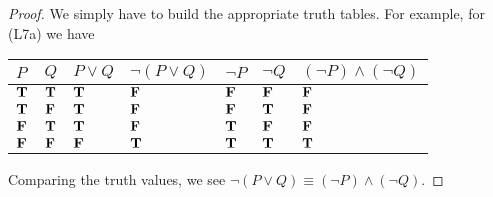 \vspace*{0.5em}
\begin{proof}
We simply have to build the appropriate truth tables. For example, for (L7a) we have\\
\begin{center}
{\renewcommand{\arraystretch}{1.5}%
\begin{tabular}{|>{\centering}m{1cm}|>{\centering}m{1cm}|>{\centering}m{1.5cm}||>{\centering}m{1.75cm}||>{\centering}m{1cm}|>{\centering}m{1cm}||>{\centering\arraybackslash}m{2.5cm}|}
\hline
\rowcolor{lightgrey}
$P$ & $Q$ & $P \vee Q$ & $\neg(P \vee Q)$ & $\neg P$ & $\neg Q$ & $(\neg P) \wedge (\neg Q)$\\
\hline
$\mathbf{T}$ & $\mathbf{T}$ & $\mathbf{T}$ & $\mathbf{F}$ & $\mathbf{F}$ & $\mathbf{F}$ & $\mathbf{F}$\\
\hline
$\mathbf{T}$ & $\mathbf{F}$ & $\mathbf{T}$ & $\mathbf{F}$ & $\mathbf{F}$ & $\mathbf{T}$ & $\mathbf{F}$\\
\hline
$\mathbf{F}$ & $\mathbf{T}$ & $\mathbf{T}$ & $\mathbf{F}$ & $\mathbf{T}$ & $\mathbf{F}$ & $\mathbf{F}$\\
\hline
$\mathbf{F}$ & $\mathbf{F}$ & $\mathbf{F}$ & $\mathbf{T}$ & $\mathbf{T}$ & $\mathbf{T}$ & $\mathbf{T}$\\
\hline
\end{tabular}
}
\end{center}
\vspace*{0.5em}
Comparing the truth values, we see $\neg (P \vee Q) \equiv (\neg P) \wedge (\neg Q)$.
\end{proof}

\vspace*{1em}

